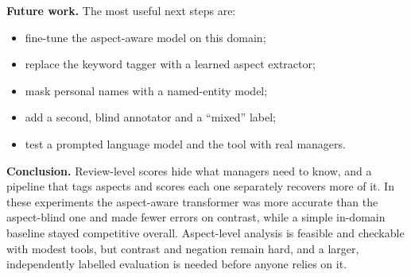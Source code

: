 \documentclass[11pt,a4paper]{article}
\begin{document}
\textbf{Future work.} The most useful next steps are:
\begin{itemize}[nosep]
  \item fine-tune the aspect-aware model on this domain;
  \item replace the keyword tagger with a learned aspect extractor;
  \item mask personal names with a named-entity model;
  \item add a second, blind annotator and a ``mixed'' label;
  \item test a prompted language model and the tool with real managers.
\end{itemize}

\textbf{Conclusion.} Review-level scores hide what managers need to know, and a pipeline that tags aspects and scores each one separately recovers more of it. In these experiments the aspect-aware transformer was more accurate than the aspect-blind one and made fewer errors on contrast, while a simple in-domain baseline stayed competitive overall. Aspect-level analysis is feasible and checkable with modest tools, but contrast and negation remain hard, and a larger, independently labelled evaluation is needed before anyone relies on it.
\end{document}
